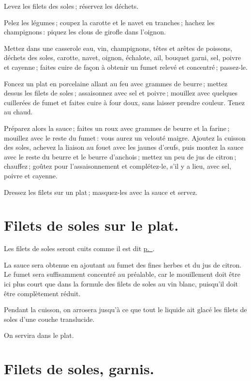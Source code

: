 Levez les filets des soles ; réservez les déchets.

Pelez les légumes ; coupez la carotte et le navet en tranches ; hachez les
champignons : piquez les clous de girofle dans l'oignon.

Mettez dans une casserole eau, vin, champignons, têtes et arêtes de poissons,
déchets des soles, carotte, navet, oignon, échalote, ail, bouquet garni, sel,
poivre et cayenne ; faites cuire de façon à obtenir un fumet relevé et
concentré ; passez-le.

Foncez un plat en porcelaine allant au feu avec {\mmm} grammes de beurre ; mettez
dessus les filets de soles ; assaisonnez avec sel et poivre ; mouillez avec quelques
cuillerées de fumet et faites cuire à four doux, sans laisser prendre couleur. Tenez
au chaud.

\label{pg0388} \hypertarget{p0388}{}
Préparez alors la sauce ; faites un roux avec {\mmm} grammes de beurre et la
farine ; mouillez avec le reste du fumet : vous aurez un velouté maigre.
Ajoutez la cuisson des soles, achevez la liaison au fouet avec les jaunes
d'œufs, puis montez la sauce avec le reste du beurre et le beurre d’anchois ;
mettez un peu de jus de citron ; chauffez ; goûtez pour l'assaisonnement et
complétez-le, s'il y a lieu, avec sel, poivre et cayenne.

Dressez les filets sur un plat ; masquez-les avec la sauce et servez.

\section*{\centering Filets de soles sur le plat.}

Les filets de soles seront cuits comme il est dit
\hyperlink{p0363}{p. \pageref{pg0363}}.

La sauce sera obtenue en ajoutant au fumet des fines herbes et du jus de citron.
Le fumet sera suffisamment concentré au préalable, car le mouillement doit être
ici plus court que dans la formule des filets de soles au vin blanc, puisqu'il doit
être complètement réduit.

Pendant la cuisson, on arrosera jusqu'à ce que tout le liquide ait glacé les filets
de soles d'une couche translucide.

On servira dans le plat.

\section*{\centering Filets de soles, garnis.}

